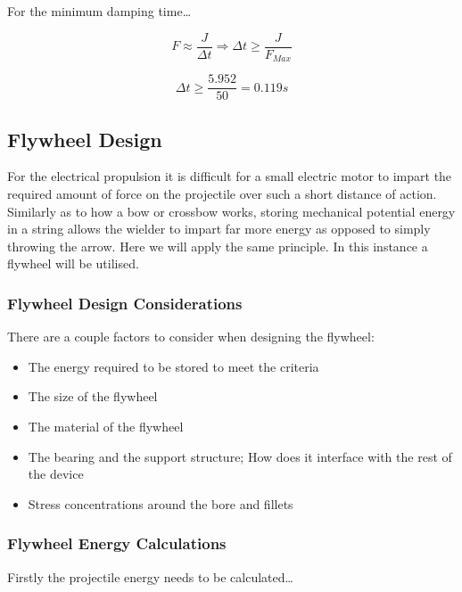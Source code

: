 \documentclass[a4paper,10pt]{article} %
\begin{document}
For the minimum damping time\ldots

\begin{equation}
    F \approx \frac{J}{\Delta t} \Rightarrow \Delta t \geq \frac{J}{F_{Max}}
\end{equation}

\begin{equation*}
    \Delta t \geq \frac{5.952}{50} = 0.119s
\end{equation*}


\newpage

\subsection{Flywheel Design}

For the electrical propulsion it is difficult for a small electric motor to impart the required amount of force on the projectile over such a short distance of action. Similarly as to how a bow or crossbow works, storing mechanical potential energy in a string allows the wielder to impart far more energy as opposed to simply throwing the arrow. Here we will apply the same principle. In this instance a flywheel will be utilised.

\subsubsection{Flywheel Design Considerations}

There are a couple factors to consider when designing the flywheel:

\begin{itemize}
    \item The energy required to be stored to meet the criteria
    \item The size of the flywheel
    \item The material of the flywheel
    \item The bearing and the support structure; How does it interface with the rest of the device
    \item Stress concentrations around the bore and fillets
\end{itemize}

\subsubsection{Flywheel Energy Calculations}

Firstly the projectile energy needs to be calculated\ldots
\end{document}
